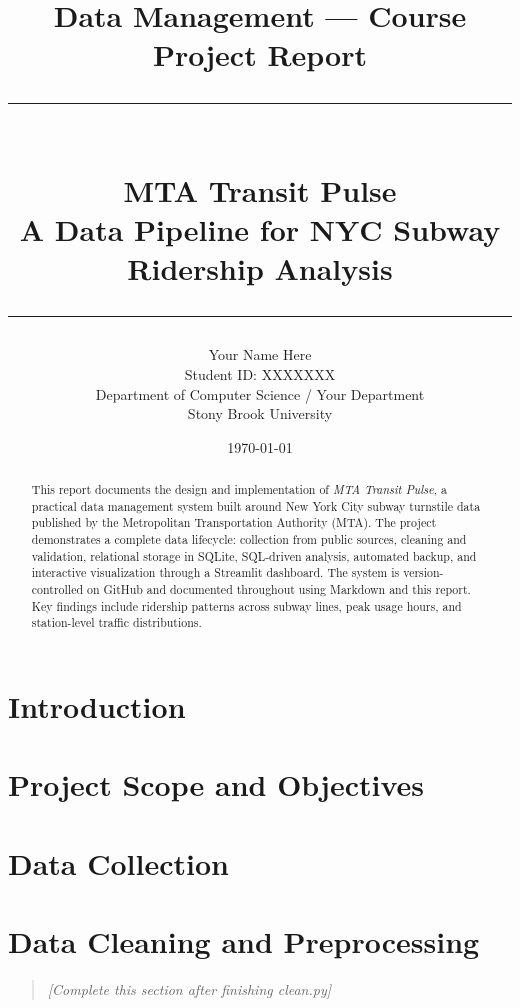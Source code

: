 \documentclass[12pt, letterpaper]{article}
\title{
    \vspace{-1cm}
    {\large Data Management — Course Project Report}\\[0.4cm]
    \rule{\linewidth}{1.5pt}\\[0.3cm]
    {\LARGE\bfseries\color{subwayBlue} MTA Transit Pulse}\\[0.2cm]
    {\large A Data Pipeline for NYC Subway Ridership Analysis}\\
    \rule{\linewidth}{1pt}
}
\author{
    Your Name Here\\
    \small Student ID: XXXXXXX\\
    \small Department of Computer Science / Your Department\\
    \small Stony Brook University
}
\date{\today}
\begin{document}

\maketitle
\thispagestyle{empty}

\begin{abstract}
\noindent
This report documents the design and implementation of \textit{MTA Transit Pulse},
a practical data management system built around New York City subway turnstile data
published by the Metropolitan Transportation Authority (MTA). The project demonstrates
a complete data lifecycle: collection from public sources, cleaning and validation,
relational storage in SQLite, SQL-driven analysis, automated backup, and interactive
visualization through a Streamlit dashboard. The system is version-controlled on GitHub
and documented throughout using Markdown and this report. Key findings include
ridership patterns across subway lines, peak usage hours, and station-level traffic
distributions.
\end{abstract}

\vspace{0.5cm}
\tableofcontents
\newpage

\section{Introduction}


\section{Project Scope and Objectives}
\label{sec:scope}


\section{Data Collection}
\label{sec:data_collection}


\section{Data Cleaning and Preprocessing}
\label{sec:cleaning}
\begin{quote}
    \textit{[Complete this section after finishing clean.py]}
\end{quote}
\end{document}
